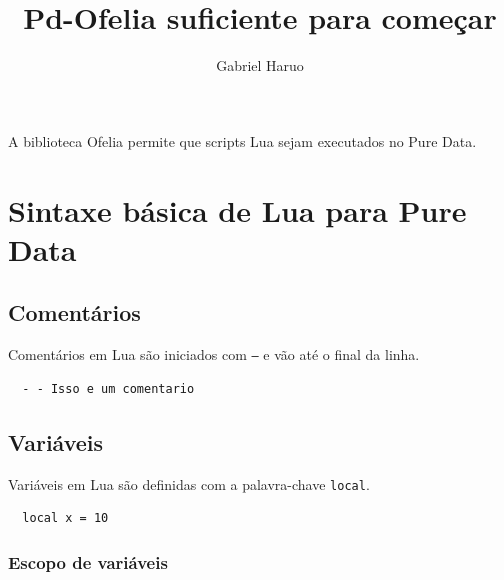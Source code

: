 \documentclass{article}
\title{Pd-Ofelia suficiente para começar}
\author{Gabriel Haruo}
\date{}
\begin{document}
\maketitle




A biblioteca Ofelia permite que scripts Lua sejam executados no Pure Data.

\section{Sintaxe básica de Lua para Pure Data}

\subsection{Comentários}

Comentários em Lua são iniciados com \texttt{--} e vão até o final da linha.

\begin{center}
  \begin{lstlisting}
  - - Isso e um comentario
  \end{lstlisting}
\end{center}

\subsection{Variáveis}

Variáveis em Lua são definidas com a palavra-chave \texttt{local}.

\begin{center}
  \begin{lstlisting}
  local x = 10
  \end{lstlisting}
\end{center}

\subsubsection{Escopo de variáveis}
\end{document}
